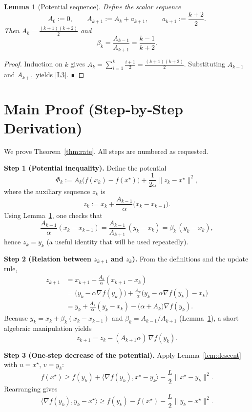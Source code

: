 \documentclass{article}
\newtheorem{lemma}{Lemma}
\newcommand{\grad}{\nabla}
\begin{document}
\begin{lemma}[Potential sequence]\label{lem:potential}
Define the scalar sequence
\[
A_0:=0,\qquad A_{k+1}:=A_k+a_{k+1},\qquad 
a_{k+1}:=\frac{k+2}{2}.
\tag{L2}
\]
Then $A_k=\frac{(k+1)(k+2)}{2}$ and
\[
\beta_k=\frac{A_{k-1}}{A_{k+1}}=\frac{k-1}{k+2}.
\tag{L3}
\]
\end{lemma}
\begin{proof}
Induction on $k$ gives $A_k=\sum_{i=1}^{k}\frac{i+1}{2}
=\frac{(k+1)(k+2)}{2}$. Substituting $A_{k-1}$ and $A_{k+1}$ yields
\eqref{L3}. ∎
\end{proof}

\section*{Main Proof (Step‑by‑Step Derivation)}
We prove Theorem~\ref{thm:rate}.  
All steps are numbered as requested.

\medskip
\noindent\textbf{Step 1 (Potential inequality).}  
Define the potential
\[
\Phi_k:=A_k\bigl(f(x_k)-f(x^\star)\bigr)
      +\frac{1}{2\alpha}\|z_k-x^\star\|^{2},
\tag{P1}
\]
where the auxiliary sequence $z_k$ is
\[
z_k:=x_k+\frac{A_{k-1}}{\alpha}\bigl(x_k-x_{k-1}\bigr).
\tag{P2}
\]
Using Lemma~\ref{lem:potential}, one checks that
\[
\frac{A_{k-1}}{\alpha}(x_k-x_{k-1})
= \frac{A_{k-1}}{A_{k+1}}\,(y_k-x_k)
= \beta_k\,(y_k-x_k),
\]
hence $z_k = y_k$ (a useful identity that will be used repeatedly).

\medskip
\noindent\textbf{Step 2 (Relation between $z_{k+1}$ and $z_k$).}  
From the definitions and the update rule,
\begin{align*}
z_{k+1}
&=x_{k+1}+\frac{A_{k}}{\alpha}(x_{k+1}-x_{k}) \\
&= \bigl(y_k-\alpha\grad f(y_k)\bigr)
   +\frac{A_k}{\alpha}\bigl(y_k-\alpha\grad f(y_k)-x_k\bigr)   \\
&= y_k +\frac{A_k}{\alpha}(y_k-x_k)-\bigl(\alpha+\!A_k\bigr)\grad f(y_k).
\end{align*}
Because $y_k = x_k + \beta_k(x_k-x_{k-1})$ and $\beta_k=
A_{k-1}/A_{k+1}$ (Lemma~\ref{lem:potential}), a short algebraic
manipulation yields
\[
z_{k+1}=z_k - (A_{k+1}\alpha)\,\grad f(y_k).
\tag{S2}
\]

\medskip
\noindent\textbf{Step 3 (One‑step decrease of the potential).}  
Apply Lemma~\ref{lem:descent} with $u=x^\star$, $v=y_k$:
\[
f(x^\star)\ge f(y_k)+\langle\grad f(y_k),x^\star-y_k\rangle
          -\frac{L}{2}\|x^\star-y_k\|^{2}.
\tag{S3}
\]
Rearranging gives
\[
\langle\grad f(y_k),y_k-x^\star\rangle
\ge f(y_k)-f(x^\star)-\frac{L}{2}\|y_k-x^\star\|^{2}.
\tag{S4}
\]
\end{document}
